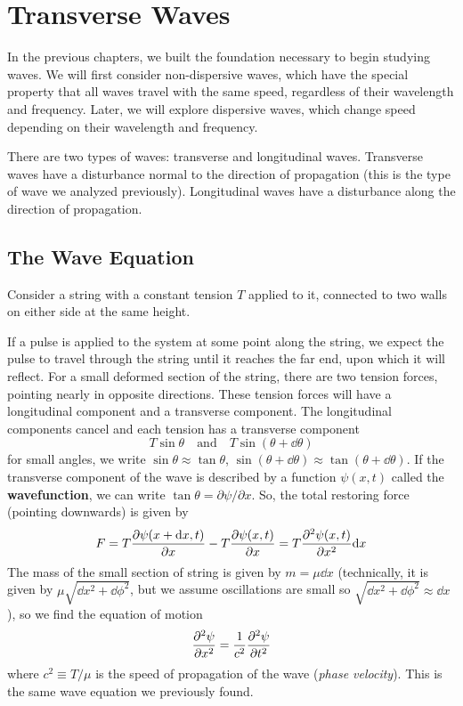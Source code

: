 \chapter{Transverse Waves}
In the previous chapters, we built the foundation necessary to begin studying waves. We will first consider non-dispersive waves, which have the special property that all waves travel with the same speed, regardless of their wavelength and frequency. Later, we will explore dispersive waves, which change speed depending on their wavelength and frequency.


There are two types of waves: transverse and longitudinal waves. Transverse waves have a disturbance normal to the direction of propagation (this is the type of wave we analyzed previously). Longitudinal waves have a disturbance along the direction of propagation.
\section{The Wave Equation}
Consider a string with a constant tension $T$ applied to it, connected to two walls on either side at the same height.  

If a pulse is applied to the system at some point along the string, we expect the pulse to travel through the string until it reaches the far end, upon which it will reflect. For a small deformed section of the string, there are two tension forces, pointing nearly in opposite directions. These tension forces will have a longitudinal component and a transverse component. The longitudinal components cancel and each tension has a transverse component
\[ T\sin\theta \quad\text{and}\quad T\sin(\theta+\dd\theta)\]
for small angles, we write $\sin\theta\approx \tan\theta$, $\sin(\theta+\dd\theta) \approx \tan(\theta+\dd\theta)$. If the transverse component of the wave is described by a function $\psi(x,t)$ called the \textbf{wavefunction}, we can write $\tan\theta = \partial \psi/\partial x$. So, the total restoring force (pointing downwards) is given by
\[ F = T\pdv{\psi(x+\dd x, t)}{x}-T\pdv{\psi(x, t)}{x} = T\pdv[2]{\psi(x,t)}{x}\dd x\]
The mass of the small section of string is given by $m = \mu\dd x$ (technically, it is given by $\mu\sqrt{\dd x^2+\dd\phi^2}$, but we assume oscillations are small so $\sqrt{\dd x^2+\dd\phi^2}\approx \dd x$), so we find the equation of motion
\[ \pdv[2]{\psi}{x} = \frac{1}{c^2} \pdv[2]{\psi}{t}\]
where $c^2\equiv T/\mu$ is the speed of propagation of the wave (\textit{phase velocity}). This is the same wave equation we previously found.

